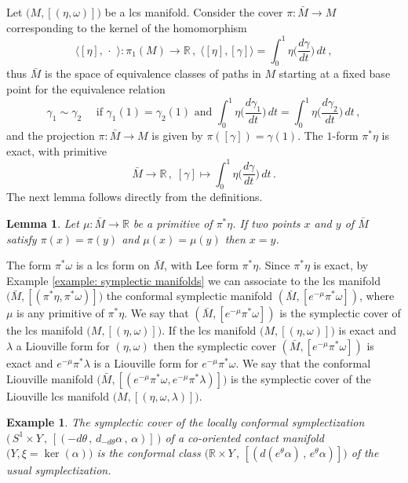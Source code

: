 \documentclass{amsart}
\newtheorem{lemma}[thm]{Lemma}
\newtheorem{example}[thm]{Example}
\theoremstyle{remark}
\begin{document}
Let $\big(M, [(\eta, \omega)]\big)$ be a lcs manifold.
Consider the cover $\pi: \bar{M} \rightarrow M$
corresponding to the kernel of the homomorphism
\[
\langle [\eta] , \,\cdot\, \,\rangle: \pi_1(M) \rightarrow \mathbb{R} \,,\;
\langle [\eta] , [\gamma] \rangle
= \int_0^1 \eta \Big(\frac{d \gamma}{d t}\Big) \, dt \,,
\]
thus $\bar{M}$ is the space
of equivalence classes of paths in $M$
starting at a fixed base point
for the equivalence relation
$$
\gamma_1 \sim \gamma_2
\quad \text{ if } \gamma_1 (1) = \gamma_2 (1)
\text{ and }
\int_0^1 \eta \big(\frac{d \gamma_1}{d t}\big) \, dt =
\int_0^1 \eta \big(\frac{d \gamma_2}{d t}\big) \, dt \,,
$$
and the projection $\pi: \bar{M} \rightarrow M$
is given by $\pi ([\gamma]) = \gamma(1)$.
The $1$-form $\pi^{\ast}\eta$ is exact,
with primitive
\[
\bar{M} \rightarrow \mathbb{R} \,,\;
[\gamma] \mapsto \int_0^1 \eta \Big(\frac{d \gamma}{d t}\Big) \, dt \,.
\]
The next lemma follows directly from the definitions.

\begin{lemma}\label{lemma: symplectic cover}
Let $\mu: \bar{M} \rightarrow \mathbb{R}$
be a primitive of $\pi^{\ast}\eta$.
If two points $x$ and $y$ of $\bar{M}$ satisfy
$\pi (x) = \pi (y)$ and $\mu (x) = \mu (y)$
then $x = y$.
\end{lemma}

The form $\pi^{\ast}\omega$ is a lcs form on $\bar{M}$,
with Lee form $\pi^{\ast}\eta$.
Since $\pi^{\ast}\eta$ is exact,
by Example \ref{example: symplectic manifolds}
we can associate to the lcs manifold
$\big( \bar{M} , [(\pi^{\ast}\eta, \pi^{\ast}\omega)] \big)$
the conformal symplectic manifold
$( \bar{M}, [e^{-\mu} \pi^{\ast}\omega])$,
where $\mu$ is any primitive of $\pi^{\ast}\eta$.
We say that $(\bar{M}, [e^{-\mu} \pi^{\ast} \omega])$
is the symplectic cover
of the lcs manifold $\big(M, [(\eta, \omega)]\big)$.
If the lcs manifold $\big(M, [(\eta, \omega)]\big)$ is exact
and $\lambda$ a Liouville form for $(\eta, \omega)$
then the symplectic cover $(\bar{M}, [e^{-\mu} \pi^{\ast} \omega])$
is exact and $e^{-\mu} \pi^{\ast} \lambda$
is a Liouville form for $e^{-\mu} \pi^{\ast} \omega$.
We say that the conformal Liouville manifold
$\big(\bar{M}, [(e^{-\mu} \pi^{\ast} \omega, e^{-\mu} \pi^{\ast} \lambda)]\big)$
is the symplectic cover
of the Liouville lcs manifold $\big(M, [(\eta, \omega, \lambda)]\big)$.

\begin{example}
The symplectic cover
of the locally conformal symplectization
$\big(\, S^1 \times Y \,,\, [(-d\theta \,,\, d_{-d\theta}\alpha \,,\, \alpha )] \,\big)$
of a co-oriented contact manifold $\big( Y, \xi = \ker (\alpha)\big)$
is the conformal class
$\big(\mathbb{R} \times Y \,,\, [(d (e^{\theta}\alpha) \,,\, e^{\theta} \alpha)]\big)$
of the usual symplectization.
\end{example}
\end{document}
